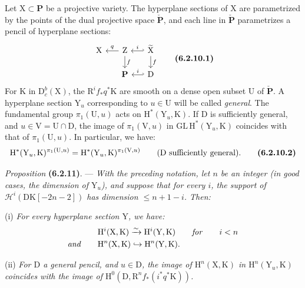 \documentclass[11pt,leqno]{article}
\begin{document}
Let \(\mathrm{X}\subset\mathbf{P}\) be a projective variety. The hyperplane sections of \(\mathrm{X}\) are parametrized by the points of the dual projective space \(\check{\mathbf{P}}\), and each line in \(\check{\mathbf{P}}\) parametrizes a pencil of hyperplane sections:
\[
\begin{tikzcd}[column sep=1.5em, row sep=1.5em]
\mathrm{X}
& \mathrm{Z} \arrow[l, "q"'] \arrow[d, "f"]
& \widetilde{\mathrm{X}} \arrow[l, hook', "i"'] \arrow[d, "f"] \\
& \mathbf{P}
& \mathrm{D} \arrow[l, hook', "i"']
\end{tikzcd}
\tag*{\textbf{(6.2.10.1)}}
\]
For \(\mathrm{K}\) in \(\mathrm{D}_c^b(\mathrm{X})\), the \(\mathrm{R}^if_*q^*\mathrm{K}\) are smooth on a dense open subset \(\mathrm{U}\) of \(\check{\mathbf{P}}\). A hyperplane section \(\mathrm{Y}_u\) corresponding to \(u\in\mathrm{U}\) will be called \textit{general}. The fundamental group \(\pi_1(\mathrm{U},u)\) acts on \(\mathrm{H}^*(\mathrm{Y}_u,\mathrm{K})\). If \(\mathrm{D}\) is sufficiently general, and \(u\in\mathrm{V}=\mathrm{U}\cap\mathrm{D}\), the image of \(\pi_1(\mathrm{V},u)\) in \(\mathrm{GL}\,\mathrm{H}^*(\mathrm{Y}_u,\mathrm{K})\) coincides with that of \(\pi_1(\mathrm{U},u)\). In particular, we have:
\[
\mathrm{H}^*(\mathrm{Y}_u,\mathrm{K})^{\pi_1(\mathrm{U},u)}
=
\mathrm{H}^*(\mathrm{Y}_u,\mathrm{K})^{\pi_1(\mathrm{V},u)}
\qquad
\text{(\(\mathrm{D}\) sufficiently general).}
\tag*{\textbf{(6.2.10.2)}}
\]

\medskip
\textit{Proposition} \textbf{(6.2.11)}. — \textit{With the preceding notation, let \(n\) be an integer (in good cases, the dimension of \(\mathrm{Y}_u\)), and suppose that for every \(i\), the support of \(\mathscr{H}^i(\mathrm{DK}[-2n-2])\) has dimension \(\leq n+1-i\). Then:}

(i) \textit{For every hyperplane section \(\mathrm{Y}\), we have:}
\begin{align*}
& \mathrm{H}^i(\mathrm{X},\mathrm{K})
  \xrightarrow{\sim}
  \mathrm{H}^i(\mathrm{Y},\mathrm{K})
  \qquad \text{\textit{for}} \qquad i<n \\
\text{\textit{and}}\qquad
& \mathrm{H}^n(\mathrm{X},\mathrm{K})
  \hookrightarrow
  \mathrm{H}^n(\mathrm{Y},\mathrm{K}).
\end{align*}

(ii) \textit{For \(\mathrm{D}\) a general pencil, and \(u\in\mathrm{D}\), the image of \(\mathrm{H}^n(\mathrm{X},\mathrm{K})\) in \(\mathrm{H}^n(\mathrm{Y}_u,\mathrm{K})\) coincides with the image of \(\mathrm{H}^0(\mathrm{D},\mathrm{R}^nf_*(i^*q^*\mathrm{K}))\).}
\end{document}
